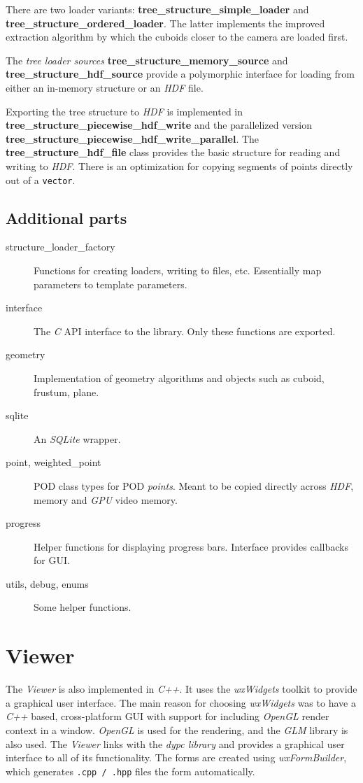 \documentclass[a4paper,10pt,abstracton,notitlepage]{scrreprt}
\begin{document}
There are two loader variants: \textbf{tree\_structure\_simple\_loader} and \textbf{tree\_structure\_ordered\_loader}. The latter implements the improved extraction algorithm by which the cuboids closer to the camera are loaded first.

The \emph{tree loader sources} \textbf{tree\_structure\_memory\_source} and \textbf{tree\_structure\_hdf\_source} provide a polymorphic interface for loading from either an in-memory structure or an \emph{HDF} file.

Exporting the tree structure to \emph{HDF} is implemented in \textbf{tree\_structure\_piecewise\_hdf\_write} and the parallelized version \textbf{tree\_structure\_piecewise\_hdf\_write\_parallel}. The \textbf{tree\_structure\_hdf\_file} class provides the basic structure for reading and writing to \emph{HDF}. There is an optimization for copying segments of points directly out of a \texttt{vector}.


\subsection{Additional parts}
\begin{description}
\item[structure\_loader\_factory] Functions for creating loaders, writing to files, etc. Essentially map parameters to template parameters.
\item[interface] The \emph{C} API interface to the library. Only these functions are exported.
\item[geometry] Implementation of geometry algorithms and objects such as cuboid, frustum, plane.
\item[sqlite] An \emph{SQLite} wrapper.
\item[point, weighted\_point] POD class types for POD \emph{points}. Meant to be copied directly across \emph{HDF}, memory and \emph{GPU} video memory.
\item[progress] Helper functions for displaying progress bars. Interface provides callbacks for GUI.
\item[utils, debug, enums] Some helper functions.
\end{description}


\pagebreak

\section{Viewer}
The \emph{Viewer} is also implemented in \emph{C++}. It uses the \emph{wxWidgets} toolkit to provide a graphical user interface. The main reason for choosing \emph{wxWidgets} was to have a \emph{C++} based, cross-platform GUI with support for including \emph{OpenGL} render context in a window.
\emph{OpenGL} is used for the rendering, and the \emph{GLM} library is also used. The \emph{Viewer} links with the \emph{dypc library} and provides a graphical user interface to all of its functionality. The forms are created using \emph{wxFormBuilder}, which generates \texttt{.cpp / .hpp} files the form automatically.
\end{document}
